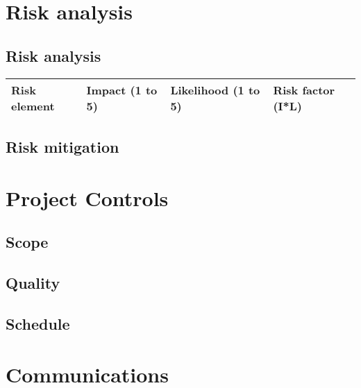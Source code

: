 \documentclass[a4paper, 12pt]{article}
\begin{document}
	\section{Risk analysis}
		\subsection{Risk analysis}
			\begin{tabular}{p{30 mm} p{30 mm} p{30 mm} p{30 mm}}
				\toprule
					Risk element & Impact (1 to 5) & Likelihood (1 to 5) & Risk factor (I*L) \\
				\bottomrule
			\end{tabular}

		\subsection{Risk mitigation}

	\newpage
	\section{Project Controls}
		\subsection{Scope}

		\subsection{Quality}

		\subsection{Schedule}

	\newpage
	\section{Communications}
\end{document}
